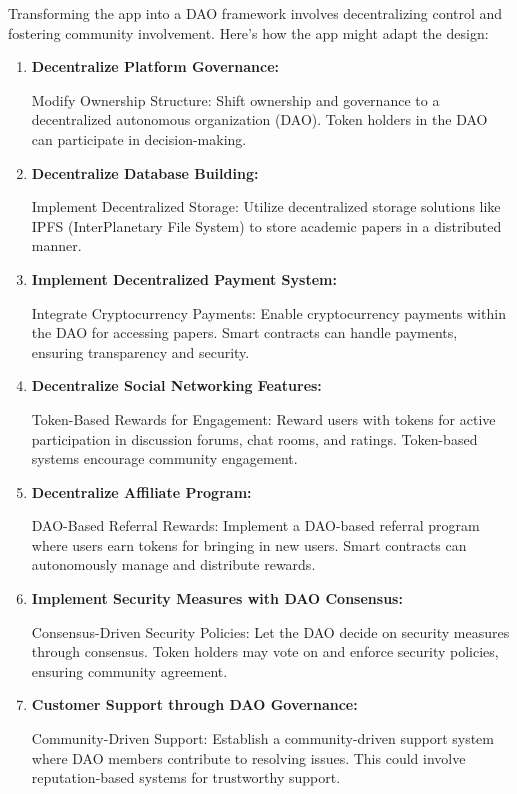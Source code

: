 \documentclass[lettersize,journal]{IEEEtran}
\begin{document}
Transforming the app into a DAO framework involves decentralizing control and fostering community involvement. Here's how the app might adapt the design:

\begin{enumerate}
  \item \textbf{Decentralize Platform Governance:}
  
  Modify Ownership Structure: Shift ownership and governance to a decentralized autonomous organization (DAO). Token holders in the DAO can participate in decision-making.
  \item \textbf{Decentralize Database Building:}
  
  Implement Decentralized Storage: Utilize decentralized storage solutions like IPFS (InterPlanetary File System) to store academic papers in a distributed manner.
  \item  \textbf{Implement Decentralized Payment System:}
  
  Integrate Cryptocurrency Payments: Enable cryptocurrency payments within the DAO for accessing papers. Smart contracts can handle payments, ensuring transparency and security.
  \item \textbf{Decentralize Social Networking Features:}
  
  Token-Based Rewards for Engagement: Reward users with tokens for active participation in discussion forums, chat rooms, and ratings. Token-based systems encourage community engagement.
  \item \textbf{Decentralize Affiliate Program:}
  
  DAO-Based Referral Rewards: Implement a DAO-based referral program where users earn tokens for bringing in new users. Smart contracts can autonomously manage and distribute rewards.
  \item \textbf{Implement Security Measures with DAO Consensus:}
  
  Consensus-Driven Security Policies: Let the DAO decide on security measures through consensus. Token holders may vote on and enforce security policies, ensuring community agreement.
  \item \textbf{Customer Support through DAO Governance:}
  
  Community-Driven Support: Establish a community-driven support system where DAO members contribute to resolving issues. This could involve reputation-based systems for trustworthy support.
\end{enumerate}
\end{document}
